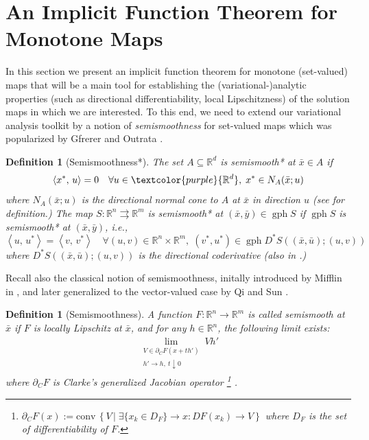 \documentclass[reqno]{amsart}
\newtheorem{definition}[proposition]{Definition}
\numberwithin{equation}{section}
\newcommand{\R}{\mathbb{R}}
\newcommand{\x}{\bar{x}}
\newcommand{\gph}{\operatorname{gph}}
\newcommand{\set}[2]{\left\{#1\,\left\vert\; #2\right.\right\}}
\newcommand{\ip}[2]{\left\langle #1,\, #2\right\rangle}
\newcommand{\co}{\mathrm{conv}\,}
\begin{document}
\section{An Implicit Function Theorem for Monotone Maps}\label{sec:Implicit}

\noindent
In this section we present an implicit function theorem for monotone (set-valued) maps that will be a main tool for establishing the (variational-)analytic properties (such as directional differentiability, local Lipschitzness) of the solution maps in which we are interested. To this end, we need to extend our variational analysis toolkit by a notion of {\em semismoothness} for set-valued maps which was popularized by Gfrerer and Outrata \cite{GfO 21}.


\begin{definition}[Semismoothness*]
	The set $A\subseteq \R^d$ is {\em semismooth*} at $\bar x\in A$ if  
	\[
	\ip{x^*}{u}=0\quad \forall u\in \textcolor{purple}{\R^d},\;  x^*\in N_A(\bar x;u)
	\]
    where $N_A(\x ; u)$ is the \emph{directional normal cone} to $A$ at $\x$ in direction $u$ (see \cite{GfO 21} for definition.)
	The map $S:\R^{n} \rightrightarrows \R^{m}$ is {\em semismooth*} at $(\bar x,\bar y)\in \gph S$ if $\gph S$ is semismooth* at $(\bar x,\bar y)$, i.e.,
	\[
	\ip{u}{u^*}=\ip{v}{v^*}\quad \forall (u,v)\in \R^{n} \times \R^{m},\; (v^*,u^*)\in\gph D^*S((\bar x,\bar u); (u,v))
	\] where $D^*S((\x, \bar u) ; (u, v))$ is the \emph{directional coderivative} (also in \cite{GfO 21}.)
\end{definition}

\noindent
Recall also the classical notion of semismoothness, initally introduced by Mifflin in \cite{Mif 77}, and later generalized to  the vector-valued case by Qi and Sun \cite{QS 93}.

\begin{definition}[Semismoothness]
    A function $F : \R^{n} \to \R^{m}$ is called \emph{semismooth} at $\x$ if $F$ is locally Lipschitz at $\x$, and for any $h \in \R^{n}$, the following limit exists:
    \begin{align*}
        \lim_{
        \substack{V \in \partial_CF(x + t h') \\
        h' \to h, \ t \downarrow 0
        }} Vh'
    \end{align*} where $\partial_C F$ is  {\em Clarke's generalized Jacobian} operator \footnote{$\partial_C F(x):=\co \set{V}{\exists \{x_k\in D_F \}\to x: DF(x_k)\to V}$ where $D_F$ is the set of differentiability of $F$.} \cite{Cla 83}.
\end{definition}
\end{document}
